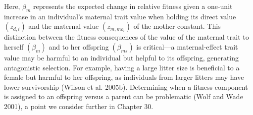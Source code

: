 \documentclass{article}
\begin{document}
Here,  $ \beta_{m} $ represents the expected change in relative fitness given a one-unit increase in an individual's maternal trait value when holding its direct value  $ (z_{d,i}) $ and the maternal value  $ (z_{m,mo_i}) $ of the mother constant. This distinction between the fitness consequences of the value of the maternal trait to herself  $ \left(\beta_{m}\right) $ and to her offspring  $ \left(\beta_{ms}\right) $ is critical—a maternal-effect trait value may be harmful to an individual but helpful to its offspring, generating antagonistic selection. For example, having a large litter size is beneficial to a female but harmful to her offspring, as individuals from larger litters may have lower survivorship (Wilson et al. 2005b). Determining when a fitness component is assigned to an offspring versus a parent can be problematic (Wolf and Wade 2001), a point we consider further in Chapter 30.
\end{document}
